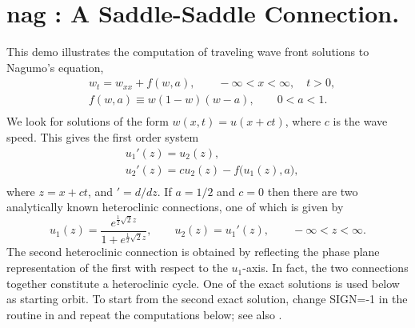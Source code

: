 \documentclass[12pt]{report}
\begin{document}
\section{ nag : A Saddle-Saddle Connection.} \label{sec:Demos_nag}
This demo illustrates the computation of traveling wave front solutions
to Nagumo's equation,
\begin{equation} \begin{array}{cl}
  & w_t = w_{xx} + f(w,a),
  \qquad -\infty < x < \infty,
  \quad  t > 0,  \\
  & f(w,a) \equiv w(1-w)(w-a), \qquad 0<a<1.  \\
\end{array} \end{equation}
We look for solutions of the form $w(x,t)=u(x+ct)$, where
$c$ is the wave speed.
This gives the first order system
\begin{equation} \begin{array}{cl}
  &  u_1'(z)  = u_2(z),  \\
  &  u_2'(z)  = c u_2(z) - f\bigl(u_1(z),a\bigr),  \\
\end{array} \end{equation}
where $z=x+ct$, and $' = d/dz$.
If $a=1/2$ and $c=0$ then there are two analytically known
heteroclinic connections, one of which is given by
$$ u_1(z) = \frac{
  {e^{\frac{1}{2} \sqrt{2} z}}
  }{
  {1 + e^{\frac{1 }{ 2} \sqrt{2} z}}  },
  \qquad  u_2(z) = u_1'(z),  \qquad  -\infty < z < \infty.
  $$
The second heteroclinic connection is obtained by reflecting the
phase plane representation of the first with respect to the
$u_1$-axis.
In fact, the two connections together constitute a heteroclinic cycle.
One of the exact solutions is used below as starting orbit.
To start from the second exact solution, change SIGN=-1 in the  
routine  in  and repeat the computations below;
see also
 \citeyear{FrDo:91}.
\end{document}
